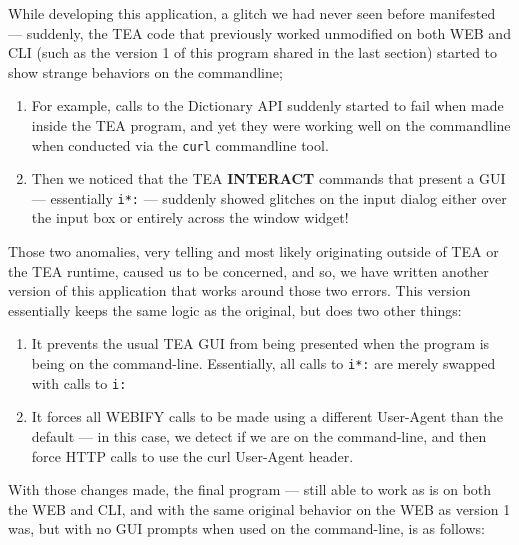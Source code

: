 \documentclass[a4paper, 18pt]{book} %
\begin{document}
{{{While developing this application, a glitch we had never seen before manifested --- suddenly, the TEA code that previously worked unmodified on both WEB and CLI (such as the version 1 of this program shared in the last section) started to show strange behaviors on the commandline; 

\vspace{2em}

\begin{enumerate}
\item For example, calls to the Dictionary API suddenly started to fail when made inside the TEA program, and yet they were working well on the commandline when conducted via the \texttt{curl} commandline tool.
\item Then we noticed that the TEA \textbf{INTERACT} commands that present a GUI --- essentially \texttt{i*:} --- suddenly showed glitches on the input dialog either over the input box or entirely across the window widget!
\end{enumerate}

\vspace{2em}


Those two anomalies, very telling and most likely originating outside of TEA or the TEA runtime, caused us to be concerned, and so, we have written another version of this application that works around those two errors. This version essentially keeps the same logic as the original, but does two other things:

\vspace{2em}

\begin{enumerate}
\item It prevents the usual TEA GUI from being presented when the program is being on the command-line. Essentially, all calls to \texttt{i*:} are merely swapped with calls to \texttt{i:}
\item It forces all WEBIFY calls to be made using a different User-Agent than the default --- in this case, we detect if we are on the command-line, and then force HTTP calls to use the curl User-Agent header.
\end{enumerate}

\vspace{2em}

With those changes made, the final program --- still able to work as is on both the WEB and CLI, and with the same original behavior on the WEB as version 1 was, but with no GUI prompts when used on the command-line, is as follows:

}}}
\end{document}
